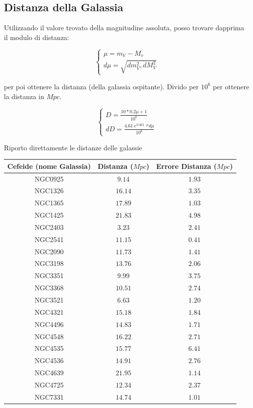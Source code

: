 \documentclass{article}
\begin{document}
\subsection{Distanza della Galassia}

Utilizzando il valore trovato della magnitudine assoluta, posso
trovare dapprima il modulo di distanza:

\begin{equation}
  \begin{cases}
    \mu = m_V - M_v \\
    d\mu = \sqrt{dm_V^2, dM_V^2}
  \end{cases}
\end{equation}

per poi ottenere la distanza (della galassia ospitante). Divido per
$10^6$ per ottenere la distanza in $Mpc$.

\begin{equation}
  \begin{cases}
    D = \frac{10*{0.2\mu +1}}{10^6} \\
    dD = \frac{4.61\; e^{0.461\cdot \mu} d\mu}{10^6}
  \end{cases}
\end{equation}

    

Riporto direttamente le distanze delle galassie 

\begin{center}
  \begin{tabular}{ccc}
  \toprule
  Cefeide (nome Galassia) & Distanza ($Mpc$) & Errore Distanza ($Mpc$)
    \\
  \midrule
    NGC0925 & $9.14$ & $1.93$ \\
    NGC1326 & $16.14$ & $3.35$ \\
    NGC1365 & $17.89$ & $1.03$ \\
    NGC1425 & $21.83$ & $4.98$ \\
    NGC2403 & $3.23$ & $2.41$ \\
    NGC2541 & $11.15$ & $0.41$ \\
    NGC2090 & $11.73$ & $1.41$ \\
    NGC3198 & $13.76$ & $2.06$ \\
    NGC3351 & $9.99$ & $3.75$ \\
    NGC3368 & $10.51$ & $2.74$ \\
    NGC3521 & $6.63$ & $1.20$ \\
    NGC4321 & $15.18$ & $1.84$ \\
    NGC4496 & $14.83$ & $1.71$ \\
    NGC4548 & $16.22$ & $2.71$ \\
    NGC4535 & $15.77$ & $6.41$ \\
    NGC4536 & $14.91$ & $2.76$ \\
    NGC4639 & $21.95$ & $1.14$ \\
    NGC4725 & $12.34$ & $2.37$ \\
    NGC7331 & $14.74$ & $1.01$ \\
  \bottomrule
 \end{tabular}
\end{center}
\end{document}
